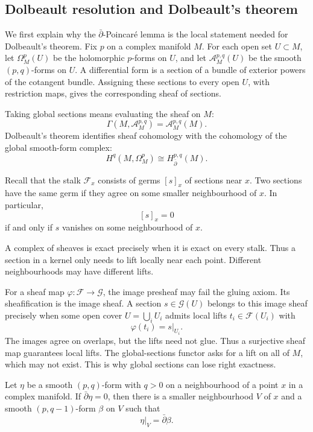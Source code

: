 \subsection{Dolbeault resolution and
Dolbeault's theorem}
\label{subsection-dolbeault-resolution}

\medskip\noindent

\noindent
We first explain why the
$\bar\partial$-Poincaré lemma is the local
statement needed for Dolbeault's theorem.
Fix $p$ on a complex manifold $M$.
For each open set $U\subset M$, let
$\Omega^p_M(U)$ be the holomorphic
$p$-forms on $U$, and let
$\mathcal A^{p,q}_M(U)$ be the smooth
$(p,q)$-forms on $U$.
A differential form is a section of a
bundle of exterior powers of the cotangent
bundle. Assigning these sections to every
open $U$, with restriction maps, gives the
corresponding sheaf of sections.

Taking global sections means evaluating the
sheaf on $M$:
$$
\Gamma(M,\mathcal A^{p,q}_M)
=
\mathcal A^{p,q}_M(M).
$$
Dolbeault's theorem identifies sheaf
cohomology with the cohomology of the global
smooth-form complex:
$$
H^q(M,\Omega^p_M)
\cong
H^{p,q}_{\bar\partial}(M).
$$

\noindent
Recall that the stalk $\mathcal F_x$
consists of germs $[s]_x$ of sections near
$x$. Two sections have the same germ if they
agree on some smaller neighbourhood of $x$.
In particular,
$$
[s]_x=0
$$
if and only if $s$ vanishes on some
neighbourhood of $x$.

A complex of sheaves is exact precisely when
it is exact on every stalk. Thus a section
in a kernel only needs to lift locally near
each point. Different neighbourhoods may
have different lifts.

For a sheaf map
$\varphi:\mathcal F\to\mathcal G$, the image
presheaf may fail the gluing axiom. Its
sheafification is the image sheaf. A section
$s\in\mathcal G(U)$ belongs to this image
sheaf precisely when some open cover
$U=\bigcup_i U_i$ admits local lifts
$t_i\in\mathcal F(U_i)$ with
$$
\varphi(t_i)=s|_{U_i}.
$$
The images agree on overlaps, but the lifts
need not glue. Thus a surjective sheaf map
guarantees local lifts. The global-sections
functor asks for a lift on all of $M$, which
may not exist. This is why global sections
can lose right exactness.

\begin{theorem}
\label{theorem-dbar-poincare}
Let $\eta$ be a smooth $(p,q)$-form with
$q>0$ on a neighbourhood of a point $x$ in
a complex manifold. If
$\bar\partial\eta=0$, then there is a smaller
neighbourhood $V$ of $x$ and a smooth
$(p,q-1)$-form $\beta$ on $V$ such that
$$
\eta|_V=\bar\partial\beta.
$$
\end{theorem}

